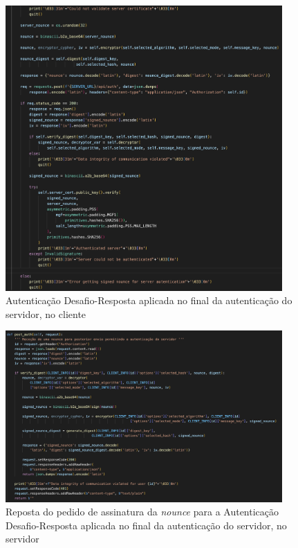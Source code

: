\documentclass[10pt,english]{article}
\begin{document}
\begin{figure}[!h]
        \centering
        \includegraphics[width=400]{images/server_auth_2_client.png}
        \caption{Autenticação Desafio-Resposta aplicada no final da autenticação do servidor, no cliente}
\end{figure}

\begin{figure}[!h]
        \centering
        \includegraphics[width=400]{images/post_auth_server.png}
        \caption{Reposta do pedido de assinatura da \textit{nounce} para a Autenticação Desafio-Resposta aplicada no final da autenticação do servidor, no servidor}
\end{figure}
\end{document}
